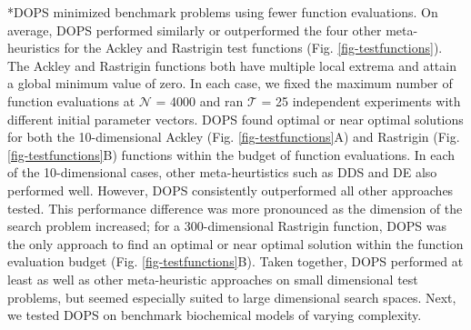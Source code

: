 \documentclass[12pt]{article}
\makeatletter
\renewcommand\subsection{\@startsection
	{subsection}{2}{0mm}
	{-0.05in}
	{-0.5\baselineskip}
	{\normalfont\normalsize\bfseries}}
\makeatother
\begin{document}
\subsection*{DOPS minimized benchmark problems using fewer function evaluations.}
On average, DOPS performed similarly or outperformed the four other meta-heuristics for the Ackley and Rastrigin test functions (Fig. \ref{fig-testfunctions}).
The Ackley and Rastrigin functions both have multiple local extrema and attain a global minimum value of zero.
In each case, we fixed the maximum number of function evaluations at $\mathcal{N}$ = 4000 and ran $\mathcal{T}$ = 25 independent experiments with different initial parameter vectors.
DOPS found optimal or near optimal solutions for both the 10-dimensional Ackley (Fig. \ref{fig-testfunctions}A) and Rastrigin (Fig. \ref{fig-testfunctions}B) functions within the budget of function evaluations.
In each of the 10-dimensional cases, other meta-heurtistics such as DDS and DE also performed well. However, DOPS consistently outperformed all other approaches tested.
This performance difference was more pronounced as the dimension of the search problem increased; for a 300-dimensional Rastrigin function, DOPS was the only approach to find an optimal or near optimal solution
within the function evaluation budget (Fig. \ref{fig-testfunctions}B).
Taken together, DOPS performed at least as well as other meta-heuristic approaches on small dimensional test problems, but seemed especially suited to large dimensional search spaces.
Next, we tested DOPS on benchmark biochemical models of varying complexity.
\end{document}
